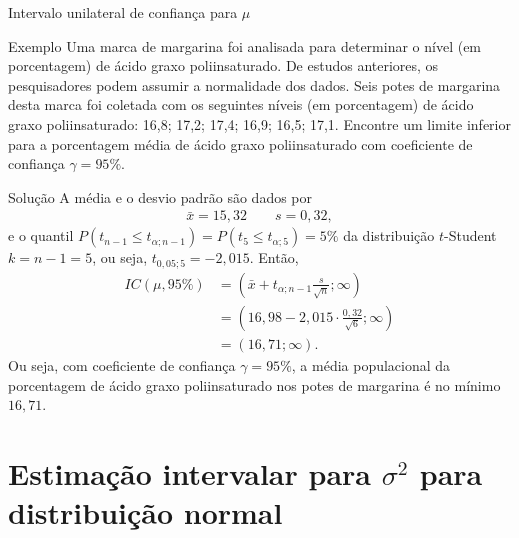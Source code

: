 \documentclass[8pt]{beamer}
\begin{document}
\begin{frame}{Intervalo unilateral de confiança para $\mu$}

\small
	
	\begin{block}{Exemplo}
		Uma marca de margarina foi analisada para determinar o nível (em porcentagem) de ácido graxo poliinsaturado. De estudos anteriores, os pesquisadores podem assumir a normalidade dos dados. Seis potes de margarina desta marca foi coletada com os seguintes níveis (em porcentagem) de ácido graxo poliinsaturado: 16,8; 17,2; 17,4; 16,9; 16,5; 17,1. Encontre um limite inferior para a porcentagem média de ácido graxo poliinsaturado com coeficiente de confiança $\gamma=95\%$.
	\end{block}

	\begin{block}{Solução}
		A média e o desvio padrão são dados por
		\begin{align*}
			\bar{x} =  15,32 \qquad s = 0,32,
		\end{align*}
		e o quantil $P(t_{n-1} \leq t_{\alpha; n-1}) = P(t_5 \leq t_{\alpha;5}) = 5\%$ da distribuição $t$-Student $k=n-1=5$, ou seja, $t_{0,05; 5}=-2,015$. Então,
		\begin{align*}
			IC(\mu, 95\%) &= \left(\bar{x} + t_{\alpha; n-1} \frac{s}{\sqrt{n}}; \infty\right)\\
			&= \left(16,98 - 2,015 \cdot \frac{0,32}{\sqrt{6}}; \infty\right)\\
			&= (16,71; \infty).
		\end{align*}
		Ou seja, com coeficiente de confiança $\gamma=95\%$, a média populacional da porcentagem de ácido graxo poliinsaturado nos potes de margarina é no mínimo $16,71$.
		
	\end{block}

\normalsize

\end{frame}

\section{Estimação intervalar para $\sigma^2$ para distribuição normal}

\large
\end{document}
